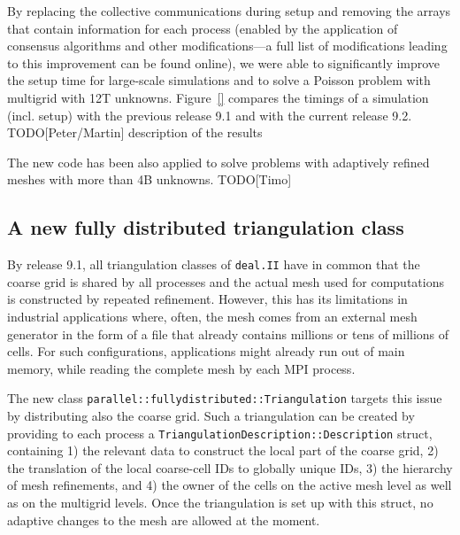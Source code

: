 \documentclass{ansarticle-preprint}
\begin{document}
By replacing the collective communications during setup and removing the arrays 
that contain information for each process (enabled by the application of consensus 
algorithms and other modifications---a full list of modifications leading to this 
improvement can be found online), we were able to significantly improve the setup 
time for large-scale simulations and to solve a Poisson problem with multigrid 
with 12T unknowns. 
Figure~\ref{} compares the timings of a simulation (incl. setup) with the 
previous release 9.1 and with the current release 9.2. 
{\color{red}TODO[Peter/Martin] description of the results}

The new code has been also applied to solve problems with adaptively refined 
meshes with more than 4B unknowns. {\color{red}TODO[Timo]}


\subsection{A new fully distributed triangulation class}
\label{subsec:pft}

By release 9.1, all triangulation classes of \texttt{deal.II} have in common that the coarse grid is shared by 
all processes and the actual mesh used for computations is constructed by repeated 
refinement. However, this has its limitations in industrial applications where, often, the mesh comes 
from an external mesh generator in the form of a file that already contains millions 
or tens of millions of cells. For such configurations, applications might already 
run out of  main memory, while reading the complete mesh by each MPI process. 

The new class \texttt{parallel::fullydistributed::Triangulation} targets this issue 
by distributing also the coarse grid. Such 
a triangulation can be created by providing to each process a \texttt{Triangulation\-De\-scrip\-tion::Description} struct, containing 
1) the relevant data to construct the local part of the coarse grid, 2) the 
translation of the local coarse-cell IDs to globally unique IDs, 3) the hierarchy 
of mesh refinements, and 4) the owner of the cells on the active mesh level as well 
as on the multigrid levels. Once the triangulation is set up with this struct, no adaptive
changes to the mesh are allowed at the moment.
 
\end{document}
